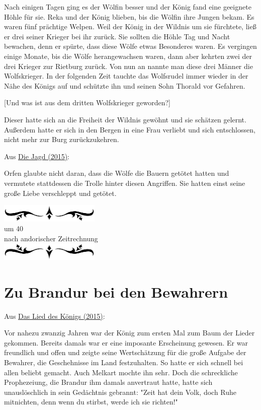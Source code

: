 \documentclass[10pt, a4paper, oneside]{book}
\newcommand{\fillbreak}{\vspace*{\fill}\columnbreak}
\newcommand{\reflegende}[1]{\hyperref[Legende: #1]{#1}}
\newcommand{\refprodukt}[1]{\hyperref[Produkt: #1]{#1}}
\newcommand{\az}[1]{%
    \begin{center}
        \includegraphics[width=180px]{Chronik der Andorversen/verzierung1.png}\\
        {\Huge #1} \\
        {nach andorischer Zeitrechnung}\\
        \includegraphics[width=180px]{Chronik der Andorversen/verzierung2.png}
    \end{center}
    \extramarks{}{#1 a.Z.}
}
\begin{document}
\begin{multicols}{2}
Nach einigen Tagen ging es der Wölfin besser und der König fand eine geeignete Höhle für sie. Reka und der König blieben, bis die Wölfin ihre Jungen bekam. Es waren fünf prächtige Welpen. Weil der König in der Wildnis um sie fürchtete, ließ er drei seiner Krieger bei ihr zurück. Sie sollten die Höhle Tag und Nacht bewachen, denn er spürte, dass diese Wölfe etwas Besonderes waren. Es vergingen einige Monate, bis die Wölfe herangewachsen waren, dann aber kehrten zwei der drei Krieger zur Rietburg zurück. Von nun an nannte man diese drei Männer die Wolfskrieger. In der folgenden Zeit tauchte das Wolfsrudel immer wieder in der Nähe des Königs auf und schützte ihn und seinen Sohn Thorald vor Gefahren.
    
[Und was ist aus dem dritten Wolfskrieger geworden?]

Dieser hatte sich an die Freiheit der Wildnis gewöhnt und sie schätzen gelernt. Außerdem hatte er sich in den Bergen in eine Frau verliebt und sich entschlossen, nicht mehr zur Burg zurückzukehren.

\begin{center}
    Aus \reflegende{Die Jagd (2015)}:
\end{center}

Orfen glaubte nicht daran, dass die Wölfe die Bauern getötet hatten und vermutete stattdessen die Trolle hinter diesen Angriffen. Sie hatten einst seine große Liebe verschleppt und getötet.




\fillbreak
\az{um 40}
\section{Zu Brandur bei den Bewahrern}




\begin{center}
    Aus \refprodukt{Das Lied des Königs (2015)}:
\end{center}

Vor nahezu zwanzig Jahren war der König zum ersten Mal zum Baum der Lieder gekommen. Bereits damals war er eine imposante Erscheinung gewesen. Er war freundlich und offen und zeigte seine Wertschätzung für die große Aufgabe der Bewahrer, die Geschehnisse im Land festzuhalten. So hatte er sich schnell bei allen beliebt gemacht. Auch Melkart mochte ihn sehr. Doch die schreckliche Prophezeiung, die Brandur ihm damals anvertraut hatte, hatte sich unauslöschlich in sein Gedächtnis gebrannt: "Zeit hat dein Volk, doch Ruhe mitnichten, denn wenn du stirbst, werde ich sie richten!"


\end{multicols}
\end{document}
